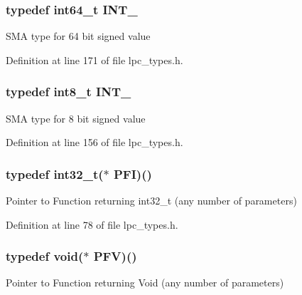 \hypertarget{group___l_p_c___types___public___types_ga1a0aab29eee6b306564084e005fa5750}{
\subsubsection[{\-I\-N\-T\-\_\-64}]{\setlength{\rightskip}{0pt plus 5cm}typedef int64\-\_\-t {\bf \-I\-N\-T\-\_}}}\label{group___l_p_c___types___public___types_ga1a0aab29eee6b306564084e005fa5750}
\-S\-M\-A type for 64 bit signed value 

\-Definition at line 171 of file lpc\-\_\-types.\-h.

\hypertarget{group___l_p_c___types___public___types_gac172005ce53b001f50a677cc10bd17b0}{
\subsubsection[{\-I\-N\-T\-\_\-8}]{\setlength{\rightskip}{0pt plus 5cm}typedef int8\-\_\-t {\bf \-I\-N\-T\-\_}}}\label{group___l_p_c___types___public___types_gac172005ce53b001f50a677cc10bd17b0}
\-S\-M\-A type for 8 bit signed value 

\-Definition at line 156 of file lpc\-\_\-types.\-h.

\hypertarget{group___l_p_c___types___public___types_ga39628beaa6435daa2ae29ba204c920da}{
\subsubsection[{\-P\-F\-I}]{\setlength{\rightskip}{0pt plus 5cm}typedef int32\-\_\-t($\ast$ {\bf \-P\-F\-I})()}}\label{group___l_p_c___types___public___types_ga39628beaa6435daa2ae29ba204c920da}
\-Pointer to \-Function returning int32\-\_\-t (any number of parameters) 

\-Definition at line 78 of file lpc\-\_\-types.\-h.

\hypertarget{group___l_p_c___types___public___types_ga2d6ebcfe3babcb204d017c685825a4d8}{
\subsubsection[{\-P\-F\-V}]{\setlength{\rightskip}{0pt plus 5cm}typedef void($\ast$ {\bf \-P\-F\-V})()}}\label{group___l_p_c___types___public___types_ga2d6ebcfe3babcb204d017c685825a4d8}
\-Pointer to \-Function returning \-Void (any number of parameters) 

